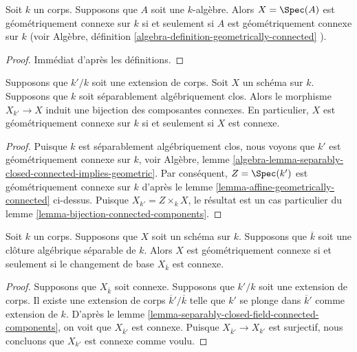 \begin{lemma}
\label{lemma-affine-geometrically-connected}
Soit $k$ un corps. Supposons que $A$
soit une $k$-algèbre. Alors $X = \Spec(A)$ est
géométriquement connexe sur $k$ si et seulement si $A$
est géométriquement connexe sur $k$ (voir Algèbre,
définition \ref{algebra-definition-geometrically-connected} ).
\end{lemma}

\begin{proof}
Immédiat d'après les définitions.
\end{proof}

\begin{lemma}
\label{lemma-separably-closed-field-connected-components}
Supposons que $k'/k$ soit une extension de corps.
Soit $X$ un schéma sur $k$. Supposons
que $k$ soit séparablement algébriquement clos. Alors
le morphisme $X_{k'} \to X$ induit une bijection des
composantes connexes. En particulier, $X$ est
géométriquement connexe sur $k$ si et seulement si $X$ est connexe.
\end{lemma}

\begin{proof}
Puisque $k$ est séparablement algébriquement clos, nous
voyons que $k'$ est géométriquement connexe sur $k$, voir
Algèbre, lemme
\ref{algebra-lemma-separably-closed-connected-implies-geometric}.
Par conséquent, $Z = \Spec(k')$ est géométriquement connexe sur
$k$ d'après le lemme \ref{lemma-affine-geometrically-connected}
ci-dessus. Puisque $X_{k'} = Z \times_k X$, le résultat est un cas
particulier du lemme \ref{lemma-bijection-connected-components}.
\end{proof}

\begin{lemma}
\label{lemma-characterize-geometrically-connected}
Soit $k$ un corps. Supposons que $X$
soit un schéma sur $k$. Supposons que $\overline{k}$
soit une clôture algébrique séparable de $k$.
Alors $X$ est géométriquement connexe si et seulement
si le changement de base $X_{\overline{k}}$ est connexe.
\end{lemma}

\begin{proof}
Supposons que $X_{\overline{k}}$ soit connexe. Supposons
que $k'/k$ soit une extension de corps. Il existe une
extension de corps $\overline{k}'/\overline{k}$ telle que
$k'$ se plonge dans $\overline{k}'$ comme extension de
$k$. D'après le lemme
\ref{lemma-separably-closed-field-connected-components}, on voit que
$X_{\overline{k}'}$ est connexe. Puisque $X_{\overline{k}'} \to X_{k'}$
est surjectif, nous concluons que $X_{k'}$ est connexe comme voulu.
\end{proof}


